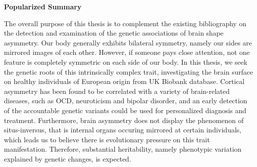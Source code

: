 
\newenvironment{popsum}%
{\cleardoublepage\thispagestyle{empty}\null\vfill\begin{center}%
		\bfseries Popularized Summary\end{center}}%
{\vfill\null}
\begin{popsum}
The overall purpose of this thesis is to complement the existing bibliography on the detection and examination of the genetic associations of brain shape asymmetry.  Our body generally exhibits bilateral symmetry, namely our sides are mirrored images of each other. However, if someone pays close attention, not one feature is completely symmetric on each side of our body. In this thesis, we seek the genetic roots of this intrinsically complex trait, investigating the brain surface on healthy individuals of European origin from UK Biobank database. Cortical asymmetry has been found to be correlated with a variety of brain-related diseases, such as OCD, neuroticism and bipolar disorder,  and an early detection of the accountable genetic variants could be used for personalized diagnosis and treatment. Furthermore, brain asymmetry does not display the phenomenon of situs-inversus, that is internal organs occuring mirrored at certain individuals, which leads us to believe there is evolutionary pressure on this trait manifestation. Therefore, substantial heritability, namely phenotypic variation explained by genetic changes, is expected.


\end{popsum}
